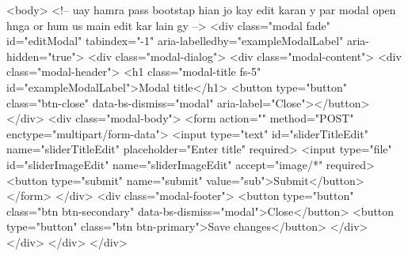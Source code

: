 <body>
    <!-- uay hamra pass bootstap hian jo kay edit karan y par modal open hnga or hum us main edit kar lain gy -->
    <div class="modal fade" id="editModal" tabindex="-1" aria-labelledby="exampleModalLabel" aria-hidden="true">
        <div class="modal-dialog">
            <div class="modal-content">
                <div class="modal-header">
                    <h1 class="modal-title fs-5" id="exampleModalLabel">Modal title</h1>
                    <button type="button" class="btn-close" data-bs-dismiss="modal" aria-label="Close"></button>
                </div>
                <div class="modal-body">
                    <form action="" method="POST" enctype="multipart/form-data">
                        <input type="text" id="sliderTitleEdit" name="sliderTitleEdit" placeholder="Enter title" required>
                        <input type="file" id="sliderImageEdit" name="sliderImageEdit" accept="image/*" required>
                        <button type="submit" name="submit" value="sub">Submit</button>
                    </form>
                </div>
                <div class="modal-footer">
                    <button type="button" class="btn btn-secondary" data-bs-dismiss="modal">Close</button>
                    <button type="button" class="btn btn-primary">Save changes</button>
                </div>
            </div>
        </div>
    </div>

